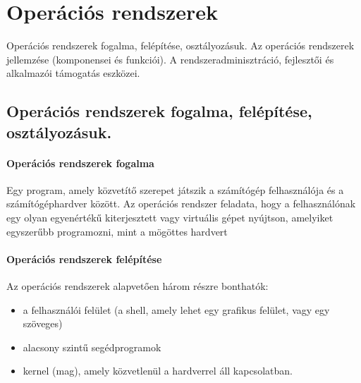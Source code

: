 \section{Operációs rendszerek}
{\footnotesize Operációs rendszerek fogalma, felépítése, osztályozásuk. Az operációs rendszerek jellemzése 	(komponensei és funkciói). A rendszeradminisztráció, fejlesztői és alkalmazói támogatás eszközei.}
\subsection{Operációs rendszerek fogalma, felépítése, osztályozásuk.}
\paragraph{Operációs rendszerek fogalma}
Egy program, amely közvetítő szerepet játszik a számítógép felhasználója
és a számítógéphardver között.
Az operációs rendszer feladata, hogy a felhasználónak egy olyan egyenértékű kiterjesztett
vagy virtuális gépet nyújtson, amelyiket egyszerűbb programozni, mint a mögöttes hardvert
\paragraph{Operációs rendszerek felépítése}
Az operációs rendszerek alapvetően három részre bonthatók:
	\begin{itemize}[nosep]
	\item a felhasználói felület (a shell, amely lehet egy grafikus felület, vagy egy szöveges)
	\item alacsony szintű segédprogramok
	\item kernel (mag), amely közvetlenül a hardverrel áll kapcsolatban.
	\end{itemize}
